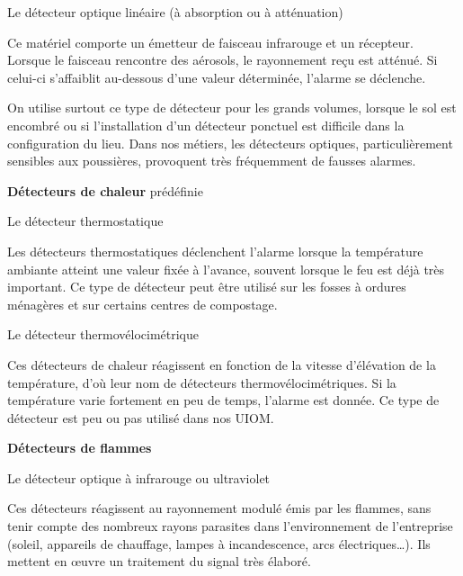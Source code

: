 Le détecteur optique linéaire (à absorption ou à atténuation)
\vspace{0.3cm}

Ce matériel comporte un émetteur de faisceau infrarouge et un récepteur. Lorsque le faisceau rencontre des aérosols, le rayonnement reçu est atténué. Si celui-ci s’affaiblit au-dessous d’une valeur déterminée, l’alarme se déclenche. 
\vspace{0.3cm}

On utilise surtout ce type de détecteur pour les grands volumes, lorsque le sol est encombré ou si l’installation d’un détecteur ponctuel est difficile dans la configuration du lieu.
Dans nos métiers, les détecteurs optiques, particulièrement sensibles aux poussières, provoquent très fréquemment de fausses alarmes.

\vspace{0.3cm}
\textbf{Détecteurs de chaleur}
\vspace{0.3cm}prédéfinie

Le détecteur thermostatique
\vspace{0.3cm}

Les détecteurs thermostatiques déclenchent l’alarme lorsque la température ambiante atteint une valeur fixée à l’avance, souvent lorsque le feu est déjà très important. 
Ce type de détecteur peut être utilisé sur les fosses à ordures ménagères et sur certains centres de compostage.

Le détecteur thermovélocimétrique
\vspace{0.3cm}

Ces détecteurs de chaleur réagissent en fonction de la vitesse d’élévation de la température, d’où leur nom de détecteurs thermovélocimétriques. Si la température varie fortement en peu de temps, l’alarme est donnée. 
Ce type de détecteur est peu ou pas utilisé dans nos UIOM.


\vspace{0.3cm}
\textbf{Détecteurs de flammes}
\vspace{0.3cm} 


Le détecteur optique à infrarouge ou ultraviolet
\vspace{0.3cm} 

Ces détecteurs réagissent au rayonnement modulé émis par les flammes, sans tenir compte des nombreux rayons parasites dans l’environnement de l’entreprise (soleil, appareils de chauffage, lampes à incandescence, arcs électriques…). Ils mettent en œuvre un traitement du signal très élaboré. 
\vspace{0.3cm}

